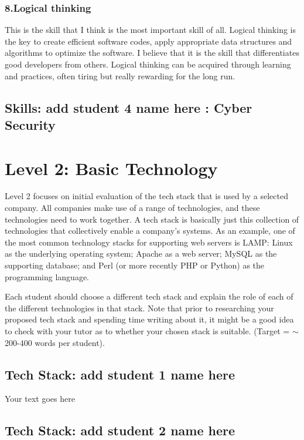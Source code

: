 \documentclass[a4paper, 11pt]{report}
\begin{document}
	\subsubsection{8.Logical thinking}
	 This is the skill that I think is the most important skill of all. Logical thinking is the key to create efficient software codes, apply appropriate data structures and algorithms to  optimize the software. I believe that it is the skill that differentiates good developers from others. Logical thinking can be acquired through learning and practices, often tiring but really rewarding for the long run. 
\subsection{Skills: add student 4 name here : Cyber Security}

\newpage
\section{Level 2: Basic Technology}

Level 2 focuses on initial evaluation of the tech stack that is used by a selected company. All companies make use of a range of technologies, and these technologies need to work together. A tech stack is basically just this collection of technologies that collectively enable a company's systems. As an example, one of the most common technology stacks for supporting web servers is LAMP: Linux as the underlying operating system; Apache as a web server; MySQL as the supporting database; and Perl (or more recently PHP or Python) as the programming language.

Each student should choose a different tech stack and explain the role of each of the different technologies in that stack. Note that prior to researching your proposed tech stack and spending time writing about it, it might be a good idea to check with your tutor as to whether your chosen stack is suitable. (Target = $\sim$200-400 words per student).

\subsection{Tech Stack: add student 1 name here}

Your text goes here

\subsection{Tech Stack: add student 2 name here}
\end{document}
